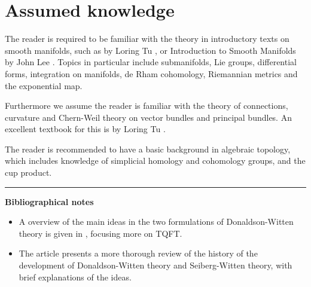 \section*{Assumed knowledge}
The reader is required to be familiar with the theory in introductory texts
on smooth manifolds, such as 
 by Loring Tu \cite{intro_tu}, or Introduction to Smooth Manifolds by
John Lee \cite{lee_smooth}. Topics in particular include submanifolds, Lie groups, 
differential forms, integration on manifolds, de Rham cohomology, Riemannian
metrics and the exponential map.

Furthermore we assume the reader is familiar with the theory of connections,
curvature and Chern-Weil theory on vector bundles and principal bundles. 
An excellent textbook for this is  by Loring Tu
\cite{loringtu}.

The reader is recommended to have a basic background in algebraic
topology, which includes knowledge of simplicial homology and cohomology groups,
and the cup product. 

\begin{comment}
	For supersymmetry chapter: 
	\citetitle{hall} \citet{hall}
\end{comment}

\vspace{5mm}
\hrule 
\vspace{5mm}

\textbf{Bibliographical notes}
{\small
\begin{itemize}
	\item A overview of the main ideas in the two formulations of 
		Donaldson-Witten theory is given in \citet{TQFTbook}, focusing more on
		TQFT.

	\item The article  \cite{history} presents a 
	more thorough review of the history of the development of Donaldson-Witten
	theory and Seiberg-Witten theory, with brief explanations of the ideas. 
\end{itemize}
}


